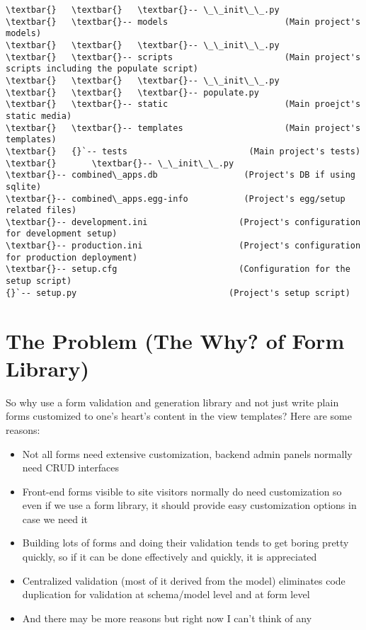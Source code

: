 \documentclass[letterpaper,10pt,english]{sphinxmanual}
\begin{document}
\begin{Verbatim}[commandchars=\\\{\}]
\textbar{}   \textbar{}   \textbar{}-- \_\_init\_\_.py
\textbar{}   \textbar{}-- models                       (Main project's models)
\textbar{}   \textbar{}   \textbar{}-- \_\_init\_\_.py
\textbar{}   \textbar{}-- scripts                      (Main project's scripts including the populate script)
\textbar{}   \textbar{}   \textbar{}-- \_\_init\_\_.py
\textbar{}   \textbar{}   \textbar{}-- populate.py
\textbar{}   \textbar{}-- static                       (Main proejct's static media)
\textbar{}   \textbar{}-- templates                    (Main project's templates)
\textbar{}   {}`-- tests                        (Main project's tests)
\textbar{}       \textbar{}-- \_\_init\_\_.py
\textbar{}-- combined\_apps.db                 (Project's DB if using sqlite)
\textbar{}-- combined\_apps.egg-info           (Project's egg/setup related files)
\textbar{}-- development.ini                  (Project's configuration for development setup)
\textbar{}-- production.ini                   (Project's configuration for production deployment)
\textbar{}-- setup.cfg                        (Configuration for the setup script)
{}`-- setup.py                              (Project's setup script)
\end{Verbatim}


\chapter{The Problem (The Why? of Form Library)}
\label{form-validation-library-choice:the-problem-the-why-of-form-library}\label{form-validation-library-choice:forms-library-choice}\label{form-validation-library-choice::doc}
So why use a form validation and generation library and not just write plain forms customized to one's heart's content in the view templates? Here are some reasons:
\begin{itemize}
\item {} 
Not all forms need extensive customization, backend admin panels normally need CRUD interfaces

\item {} 
Front-end forms visible to site visitors normally do need customization so even if we use a form library, it should provide easy customization options in case we need it

\item {} 
Building lots of forms and doing their validation tends to get boring pretty quickly, so if it can be done effectively and quickly, it is appreciated

\item {} 
Centralized validation (most of it derived from the model) eliminates code duplication for validation at schema/model level and at form level

\item {} 
And there may be more reasons but right now I can't think of any

\end{itemize}
\end{document}
